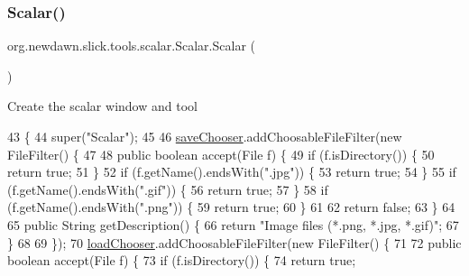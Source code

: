 \subsubsection{\texorpdfstring{Scalar()}{Scalar()}}
{\footnotesize\ttfamily org.\+newdawn.\+slick.\+tools.\+scalar.\+Scalar.\+Scalar (\begin{DoxyParamCaption}{ }\end{DoxyParamCaption})\hspace{0.3cm}{\ttfamily [inline]}}

Create the scalar window and tool 
\begin{DoxyCode}
43                     \{
44         super(\textcolor{stringliteral}{"Scalar"});
45 
46         \mbox{\hyperlink{classorg_1_1newdawn_1_1slick_1_1tools_1_1scalar_1_1_scalar_aaba5299d75aaf1c811ea0a7395ef2afb}{saveChooser}}.addChoosableFileFilter(\textcolor{keyword}{new} FileFilter() \{
47 
48             \textcolor{keyword}{public} \textcolor{keywordtype}{boolean} accept(File f) \{
49                 \textcolor{keywordflow}{if} (f.isDirectory()) \{
50                     \textcolor{keywordflow}{return} \textcolor{keyword}{true};
51                 \}
52                 \textcolor{keywordflow}{if} (f.getName().endsWith(\textcolor{stringliteral}{".jpg"})) \{
53                     \textcolor{keywordflow}{return} \textcolor{keyword}{true};
54                 \}
55                 \textcolor{keywordflow}{if} (f.getName().endsWith(\textcolor{stringliteral}{".gif"})) \{
56                     \textcolor{keywordflow}{return} \textcolor{keyword}{true};
57                 \}
58                 \textcolor{keywordflow}{if} (f.getName().endsWith(\textcolor{stringliteral}{".png"})) \{
59                     \textcolor{keywordflow}{return} \textcolor{keyword}{true};
60                 \}
61                 
62                 \textcolor{keywordflow}{return} \textcolor{keyword}{false};
63             \}
64 
65             \textcolor{keyword}{public} String getDescription() \{
66                 \textcolor{keywordflow}{return} \textcolor{stringliteral}{"Image files (*.png, *.jpg, *.gif)"};
67             \}
68             
69         \});
70         \mbox{\hyperlink{classorg_1_1newdawn_1_1slick_1_1tools_1_1scalar_1_1_scalar_a36ca61e15f5624af75dfa66a9212e97e}{loadChooser}}.addChoosableFileFilter(\textcolor{keyword}{new} FileFilter() \{
71 
72             \textcolor{keyword}{public} \textcolor{keywordtype}{boolean} accept(File f) \{
73                 \textcolor{keywordflow}{if} (f.isDirectory()) \{
74                     \textcolor{keywordflow}{return} \textcolor{keyword}{true};

\end{DoxyCode}
